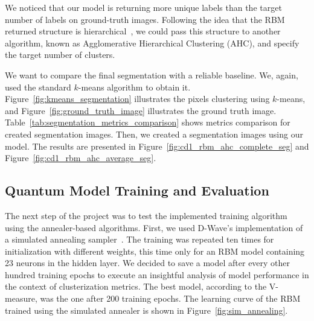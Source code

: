 \documentclass[runningheads]{llncs}
\begin{document}
We noticed that our model is returning more unique labels than the target number
of labels on ground-truth images. Following the idea that the RBM returned
structure is hierarchical~\cite{Decelle2023}, we could pass this structure to
another algorithm, known as Agglomerative Hierarchical Clustering (AHC), and
specify the target number of clusters.

We want to compare the final segmentation with a reliable baseline. We, again,
used the standard $k$-means algorithm to obtain it.
Figure~\ref{fig:kmeans_segmentation} illustrates the pixels clustering using
$k$-means, and Figure~\ref{fig:ground_truth_image} illustrates the ground truth
image. Table~\ref{tab:segmentation_metrics_comparison} shows metrics comparison
for created segmentation images. Then, we created a segmentation images using
our model. The results are presented in
Figure~\ref{fig:cd1_rbm_ahc_complete_seg} and
Figure~\ref{fig:cd1_rbm_ahc_average_seg}.

\subsection{Quantum Model Training and Evaluation}
The next step of the project was to test the implemented training algorithm
using the annealer-based algorithms. First, we used D-Wave's implementation of a
simulated annealing sampler~\cite{DWaveDocumentation}. The training was repeated
ten times for initialization with different weights, this time only for an RBM
model containing 23 neurons in the hidden layer. We decided to save a model
after every other hundred training epochs to execute an insightful analysis of
model performance in the context of clusterization metrics. The best model,
according to the V-measure, was the one after 200 training epochs. The learning
curve of the RBM trained using the simulated annealer is shown in
Figure~\ref{fig:sim_annealing}.
\end{document}
